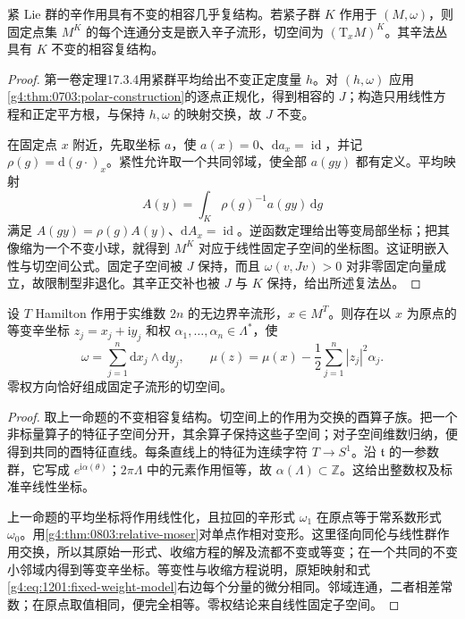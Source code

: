 \begin{proposition}\label{g4:prop:1201:invariant-complex-fixed-set}
	紧 Lie 群的辛作用具有不变的相容几乎复结构。若紧子群 \(K\) 作用于 \((M,\omega)\)，则固定点集 \(M^K\) 的每个连通分支是嵌入辛子流形，切空间为 \((\mathrm T_xM)^K\)。其辛法丛具有 \(K\) 不变的相容复结构。
\end{proposition}
\begin{proof}
	第一卷定理17.3.4用紧群平均给出不变正定度量 \(h\)。对 \((h,\omega)\) 应用\cref{g4:thm:0703:polar-construction}的逐点正规化，得到相容的 \(J\)；构造只用线性方程和正定平方根，与保持 \(h,\omega\) 的映射交换，故 \(J\) 不变。

	在固定点 \(x\) 附近，先取坐标 \(a\)，使 \(a(x)=0\)、\(\mathrm da_x=\operatorname{id}\)，并记 \(\rho(g)=\mathrm d(g\cdot)_x\)。紧性允许取一个共同邻域，使全部 \(a(gy)\) 都有定义。平均映射
	\[
		A(y)=\int_K\rho(g)^{-1}a(gy)\,\mathrm dg
	\]
	满足 \(A(gy)=\rho(g)A(y)\)、\(\mathrm dA_x=\operatorname{id}\)。逆函数定理给出等变局部坐标；把其像缩为一个不变小球，就得到 \(M^K\) 对应于线性固定子空间的坐标图。这证明嵌入性与切空间公式。固定子空间被 \(J\) 保持，而且 \(\omega(v,Jv)>0\) 对非零固定向量成立，故限制型非退化。其辛正交补也被 \(J\) 与 \(K\) 保持，给出所述复法丛。
\end{proof}

\begin{theorem}\label{g4:thm:1201:fixed-weight-model}
	设 \(T\) Hamilton 作用于实维数 \(2n\) 的无边界辛流形，\(x\in M^T\)。则存在以 \(x\) 为原点的等变辛坐标 \(z_j=x_j+\mathrm iy_j\) 和权 \(\alpha_1,\ldots,\alpha_n\in\Lambda^*\)，使
	\begin{equation}\label{g4:eq:1201:fixed-weight-model}
		\omega=\sum_{j=1}^n\mathrm dx_j\wedge\mathrm dy_j,
		\qquad
		\mu(z)=\mu(x)-\frac12\sum_{j=1}^n|z_j|^2\alpha_j.
	\end{equation}
	零权方向恰好组成固定子流形的切空间。
\end{theorem}
\begin{proof}
	取上一命题的不变相容复结构。切空间上的作用为交换的酉算子族。把一个非标量算子的特征子空间分开，其余算子保持这些子空间；对子空间维数归纳，便得到共同的酉特征直线。每条直线上的特征为连续字符 \(T\to S^1\)。沿 \(\mathfrak t\) 的一参数群，它写成 \(e^{\mathrm i\alpha(\theta)}\)；\(2\pi\Lambda\) 中的元素作用恒等，故 \(\alpha(\Lambda)\subset\mathbb Z\)。这给出整数权及标准辛线性坐标。

	上一命题的平均坐标将作用线性化，且拉回的辛形式 \(\omega_1\) 在原点等于常系数形式 \(\omega_0\)。用\cref{g4:thm:0803:relative-moser}对单点作相对变形。这里径向同伦与线性群作用交换，所以其原始一形式、收缩方程的解及流都不变或等变；在一个共同的不变小邻域内得到等变辛坐标。等变性与收缩方程说明，原矩映射和式\eqref{g4:eq:1201:fixed-weight-model}右边每个分量的微分相同。邻域连通，二者相差常数；在原点取值相同，便完全相等。零权结论来自线性固定子空间。\cite[第5.7节，定理5.22，第159页]{Cannas2006Symplectic}
\end{proof}


